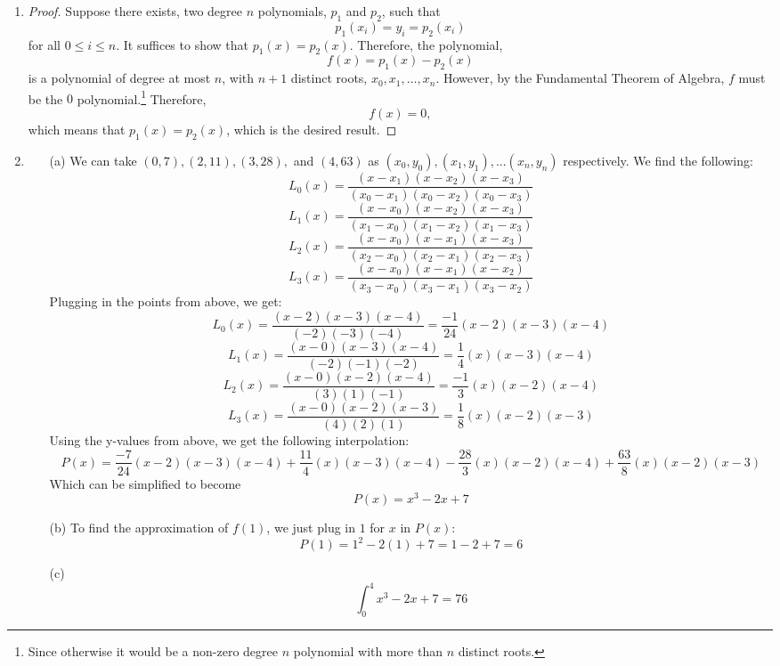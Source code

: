 \documentclass[12pt]{article}
\begin{document}
\begin{enumerate}[leftmargin=2em]
    
    \item 
    \begin{proof}
        Suppose there exists, two degree $n$ polynomials, $p_1$ and $p_2$, such that
        \[p_{1}(x_i)=y_i=p_{2}(x_i)\]
        for all $0\leq i\leq n$. It suffices to show that $p_1(x)=p_2(x)$. Therefore, the polynomial, 
        \[f(x)=p_{1}(x)-p_{2}(x)\]
        is a polynomial of degree at most $n$, with $n+1$ distinct roots, $x_0,x_1,\ldots,x_n$. However, by the Fundamental Theorem of Algebra, $f$ must be the $0$ polynomial.\footnote{Since otherwise it would be a non-zero degree $n$ polynomial with more than $n$ distinct roots.}
        Therefore, \[f(x)=0,\] which means that $p_1(x)=p_2(x)$, which is the desired result.
    \end{proof}
    \item
    \begin{enumerate}
        \item[(a)] We can take $(0,7), (2, 11), (3, 28),$ and $(4,63)$ as $(x_0, y_0), (x_1, y_1), ... (x_n, y_n)$ respectively. We find the following:
        \[L_0(x) = \frac{(x-x_{1})(x-x_{2})(x-x_{3})}{(x_{0}-x_{1})(x_{0}-x_{2})(x_{0}-x_{3})}\]
        \[L_1(x) = \frac{(x-x_{0})(x-x_{2})(x-x_{3})}{(x_{1}-x_{0})(x_{1}-x_{2})(x_{1}-x_{3})}\]
        \[L_2(x) = \frac{(x-x_{0})(x-x_{1})(x-x_{3})}{(x_{2}-x_{0})(x_{2}-x_{1})(x_{2}-x_{3})}\]
        \[L_3(x) = \frac{(x-x_{0})(x-x_{1})(x-x_{2})}{(x_{3}-x_{0})(x_{3}-x_{1})(x_{3}-x_{2})}\]
        Plugging in the points from above, we get:
        \[L_0(x) = \frac{(x-2)(x-3)(x-4)}{(-2)(-3)(-4)} = \frac{-1}{24}(x-2)(x-3)(x-4)\]
        \[L_1(x) = \frac{(x-0)(x-3)(x-4)}{(-2)(-1)(-2)} = \frac{1}{4}(x)(x-3)(x-4)\]
        \[L_2(x) = \frac{(x-0)(x-2)(x-4)}{(3)(1)(-1)} = \frac{-1}{3}(x)(x-2)(x-4)\]
        \[L_3(x) = \frac{(x-0)(x-2)(x-3)}{(4)(2)(1)} = \frac{1}{8}(x)(x-2)(x-3)\]
        Using the y-values from above, we get the following interpolation:
        \[P(x)=\frac{-7}{24}(x-2)(x-3)(x-4) 
        + \frac{11}{4}(x)(x-3)(x-4)-\frac{28}{3}(x)(x-2)(x-4)
        +\frac{63}{8}(x)(x-2)(x-3)\]
        Which can be simplified to become 
        \[P(x) = x^3-2x+7\]
        \item[(b)]        
        To find the approximation of $f(1)$, we just plug in $1$ for $x$ in $P(x)$:
        \[P(1)=1^2-2(1)+7 = 1 - 2 + 7 = 6\]
        \item[(c)]
        \[\int_{0}^{4}x^3-2x+7 = 76\]
    \end{enumerate}


\end{enumerate}
\end{document}
